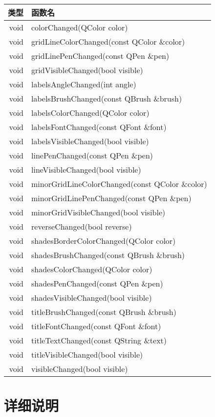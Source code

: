 \begin{longtable}[l]{|r|l|}
\hline 
类型 & 函数名\\
\hline
void&	colorChanged(QColor color)\\
\hline
void&	gridLineColorChanged(const QColor \&color)\\
\hline
void&	gridLinePenChanged(const QPen \&pen)\\
\hline
void&	gridVisibleChanged(bool visible)\\
\hline
void&	labelsAngleChanged(int angle)\\
\hline
void&	labelsBrushChanged(const QBrush \&brush)\\
\hline
void&	labelsColorChanged(QColor color)\\
\hline
void&	labelsFontChanged(const QFont \&font)\\
\hline
void&	labelsVisibleChanged(bool visible)\\
\hline
void&	linePenChanged(const QPen \&pen)\\
\hline
void&	lineVisibleChanged(bool visible)\\
\hline
void&	minorGridLineColorChanged(const QColor \&color)\\
\hline
void&	minorGridLinePenChanged(const QPen \&pen)\\
\hline
void&	minorGridVisibleChanged(bool visible)\\
\hline
void&	reverseChanged(bool reverse)\\
\hline
void&	shadesBorderColorChanged(QColor color)\\
\hline
void&	shadesBrushChanged(const QBrush \&brush)\\
\hline
void&	shadesColorChanged(QColor color)\\
\hline
void&	shadesPenChanged(const QPen \&pen)\\
\hline
void&	shadesVisibleChanged(bool visible)\\
\hline
void&	titleBrushChanged(const QBrush \&brush)\\
\hline
void&	titleFontChanged(const QFont \&font)\\
\hline
void&	titleTextChanged(const QString \&text)\\
\hline
void&	titleVisibleChanged(bool visible)\\
\hline
void&	visibleChanged(bool visible)\\
\hline
\end{longtable}

\section{详细说明}

